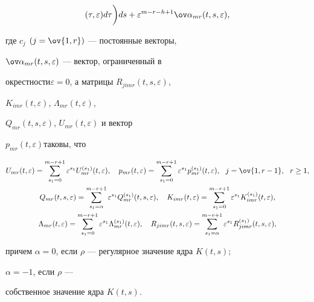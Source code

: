 \begin{thm}
\begin{gather}
(\tau,\varepsilon)d\tau\bigg)ds+ 


\varepsilon^{m-r-h+1}\ov\alpha_{mr}(t,s,\varepsilon), 


\end{gather} 


где $c_j$ $(j=\ov{1,r})$ --- постоянные векторы, 


$\ov\alpha_{mr}(t,s,\varepsilon)$ --- вектор, ограниченный в 


окрестности\linebreak $\varepsilon=0$, а матрицы $R_{jimr}(t,s,\varepsilon)$, 


$K_{imr}(t,\varepsilon)$, $\Lambda_{mr}(t,\varepsilon)$, 


$Q_{mr}(t,s,\varepsilon)$, $U_{mr}(t,\varepsilon)$ и вектор 


$p_{mr}(t,\varepsilon)$\linebreak таковы, что 


\begin{gather} 


U_{mr}(t,\varepsilon)=\sum^{m-r+1}_{s_1=0} 


\varepsilon^{s_1}U^{(s_1)}_{mr}(t,\varepsilon),\quad 


p_{mr}(t,\varepsilon)=\sum^{m-r+1}_{s_1=0} 


\varepsilon^{s_1}p^{(s_1)}_{mr}(t,\varepsilon), 


\ \ j=\ov{1,r-1},\ \ r\ge1,\notag \\ 


% 


Q_{mr}(t,s,\varepsilon)=\sum^{m-r+1}_{s_1=\alpha} 


\varepsilon^{s_1}Q^{(s_1)}_{mr}(t,s,\varepsilon),\quad 


K_{imr}(t,\varepsilon)=\sum^{m-r+1}_{s_1=0} 


\varepsilon^{s_1}K^{(s_1)}_{imr}(t,\varepsilon), \\ 


% 


\Lambda_{mr}(t,\varepsilon)=\sum^{m-r+1}_{s_1=0} 


\varepsilon^{s_1}\Lambda^{(s_1)}_{mr}(t,\varepsilon),\quad 


R_{jimr}(t,s,\varepsilon)=\sum^{m-r+1}_{s_1=\alpha} 


\varepsilon^{s_1}R^{(s_1)}_{jimr}(t,s,\varepsilon),\notag 


\end{gather} 


причем $\alpha=0$, если $\rho$ --- регулярное значение ядра $K(t,s);$ 


$\alpha=-1$, если $\rho$ --- 


собственное значение ядра $K(t,s)$. 


\end{thm} 


